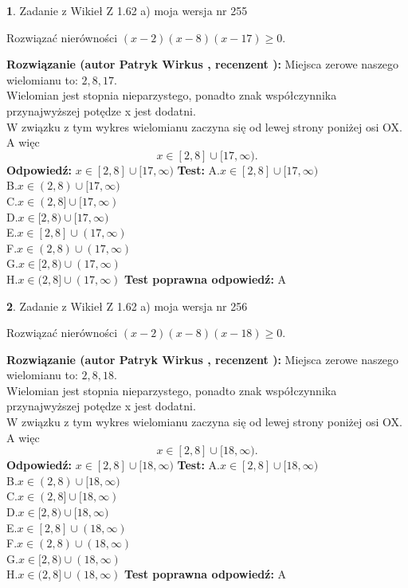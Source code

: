 \documentclass[12pt, a4paper]{article}
\theoremstyle{definition} %
\newtheorem{zad}{}
\newcommand{\zadStart}[1]{\begin{zad}#1\newline}
\newcommand{\zadStop}{\end{zad}}
\newcommand{\rozwStart}[2]{\noindent \textbf{Rozwiązanie (autor #1 , recenzent #2): }\newline}
\newcommand{\rozwStop}{\newline}
\newcommand{\odpStart}{\noindent \textbf{Odpowiedź:}\newline}
\newcommand{\odpStop}{\newline}
\newcommand{\testStart}{\noindent \textbf{Test:}\newline}
\newcommand{\testStop}{\newline}
\newcommand{\kluczStart}{\noindent \textbf{Test poprawna odpowiedź:}\newline}
\newcommand{\kluczStop}{\newline}
\begin{document}
\zadStart{Zadanie z Wikieł Z 1.62 a) moja wersja nr 255}

Rozwiązać nierówności $(x-2)(x-8)(x-17)\ge0$.
\zadStop
\rozwStart{Patryk Wirkus}{}
Miejsca zerowe naszego wielomianu to: $2, 8, 17$.\\
Wielomian jest stopnia nieparzystego, ponadto znak współczynnika przy\linebreak najwyższej potędze x jest dodatni.\\ W związku z tym wykres wielomianu zaczyna się od lewej strony poniżej osi OX. A więc $$x \in [2,8] \cup [17,\infty).$$
\rozwStop
\odpStart
$x \in [2,8] \cup [17,\infty)$
\odpStop
\testStart
A.$x \in [2,8] \cup [17,\infty)$\\
B.$x \in (2,8) \cup [17,\infty)$\\
C.$x \in (2,8] \cup [17,\infty)$\\
D.$x \in [2,8) \cup [17,\infty)$\\
E.$x \in [2,8] \cup (17,\infty)$\\
F.$x \in (2,8) \cup (17,\infty)$\\
G.$x \in [2,8) \cup (17,\infty)$\\
H.$x \in (2,8] \cup (17,\infty)$
\testStop
\kluczStart
A
\kluczStop



\zadStart{Zadanie z Wikieł Z 1.62 a) moja wersja nr 256}

Rozwiązać nierówności $(x-2)(x-8)(x-18)\ge0$.
\zadStop
\rozwStart{Patryk Wirkus}{}
Miejsca zerowe naszego wielomianu to: $2, 8, 18$.\\
Wielomian jest stopnia nieparzystego, ponadto znak współczynnika przy\linebreak najwyższej potędze x jest dodatni.\\ W związku z tym wykres wielomianu zaczyna się od lewej strony poniżej osi OX. A więc $$x \in [2,8] \cup [18,\infty).$$
\rozwStop
\odpStart
$x \in [2,8] \cup [18,\infty)$
\odpStop
\testStart
A.$x \in [2,8] \cup [18,\infty)$\\
B.$x \in (2,8) \cup [18,\infty)$\\
C.$x \in (2,8] \cup [18,\infty)$\\
D.$x \in [2,8) \cup [18,\infty)$\\
E.$x \in [2,8] \cup (18,\infty)$\\
F.$x \in (2,8) \cup (18,\infty)$\\
G.$x \in [2,8) \cup (18,\infty)$\\
H.$x \in (2,8] \cup (18,\infty)$
\testStop
\kluczStart
A
\kluczStop
\end{document}

